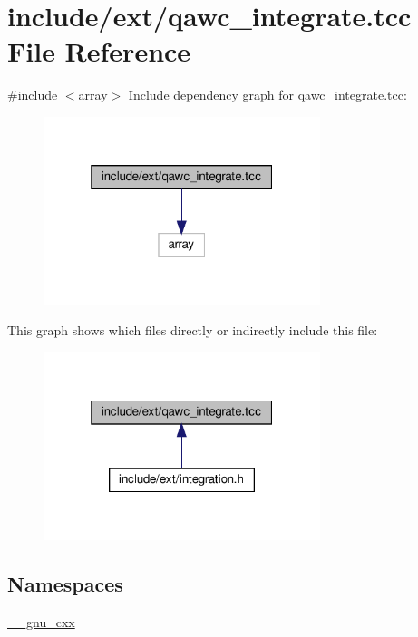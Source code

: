 \hypertarget{qawc__integrate_8tcc}{}\section{include/ext/qawc\+\_\+integrate.tcc File Reference}
\label{qawc__integrate_8tcc}
{\ttfamily \#include $<$array$>$}\newline
Include dependency graph for qawc\+\_\+integrate.\+tcc\+:
\nopagebreak
\begin{figure}[H]
\begin{center}
\leavevmode
\includegraphics[width=229pt]{qawc__integrate_8tcc__incl}
\end{center}
\end{figure}
This graph shows which files directly or indirectly include this file\+:
\nopagebreak
\begin{figure}[H]
\begin{center}
\leavevmode
\includegraphics[width=229pt]{qawc__integrate_8tcc__dep__incl}
\end{center}
\end{figure}
\subsection*{Namespaces}
\begin{DoxyCompactItemize}
\item 
 \hyperlink{namespace____gnu__cxx}{\+\_\+\+\_\+gnu\+\_\+cxx}
\end{DoxyCompactItemize}
